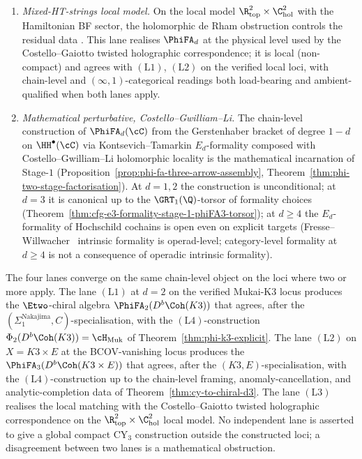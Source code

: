 \begin{definition}
\begin{enumerate}[label=\textup{(L\arabic*)},leftmargin=2em,itemsep=2pt]
\item[(L3)] \emph{Mixed-HT-strings local model.} On the local model
$\R^2_{\mathrm{top}} \times \C^2_{\mathrm{hol}}$ with the
Hamiltonian BF sector, the holomorphic de Rham obstruction
controls the residual data \cite{LorgatMixedHTStrings}. This lane
realises $\PhiFA_d$ at the physical level used by the
Costello--Gaiotto twisted holographic correspondence; it is local
(non-compact) and agrees with $(\mathrm{L1})$, $(\mathrm{L2})$ on
the verified local loci, with chain-level and
$(\infty, 1)$-categorical readings both load-bearing and
ambient-qualified when both lanes apply.

\item[(L4)] \emph{Mathematical perturbative,
Costello--Gwilliam--Li.} The chain-level construction of
$\PhiFA_d(\cC)$ from the Gerstenhaber bracket of degree $1 - d$ on
$\HH^\bullet(\cC)$ via Kontsevich--Tamarkin $E_d$-formality
\cite{Kontsevich1999, Tamarkin2007} composed with
Costello--Gwilliam--Li holomorphic locality
\cite{CostelloGwilliam2017, CostelloLi2016, CostelloLi2020} is the
mathematical incarnation of Stage-$1$
(Proposition~\ref{prop:phi-fa-three-arrow-assembly},
Theorem~\ref{thm:phi-two-stage-factorisation}). At $d = 1, 2$ the
construction is unconditional; at $d = 3$ it is canonical up to the
$\GRT_1(\Q)$-torsor of formality choices
(Theorem~\ref{thm:cfg-e3-formality-stage-1-phiFA3-torsor}); at
$d \ge 4$ the $E_d$-formality of Hochschild cochains is open even on
explicit targets (Fresse--Willwacher~\cite{Willwacher2015} intrinsic
formality is operad-level; category-level formality at $d \ge 4$ is
not a consequence of operadic intrinsic formality).
\end{enumerate}
\end{definition}

\begin{remark}
\label{rem:four-lane-agreement}
The four lanes converge on the same chain-level object on the loci
where two or more apply. The lane $(\mathrm{L1})$ at $d = 2$ on the
verified Mukai-K3 locus produces the $\Etwo$-chiral algebra
$\PhiFA_2(D^b\Coh(K3))$ that agrees, after the
$(\Sigma_1^{\mathrm{Nakajima}}, C)$-specialisation, with the
$(\mathrm{L4})$-construction $\Phi_2(D^b\Coh(K3)) = \cH_{\mathrm{Muk}}$
of Theorem~\ref{thm:phi-k3-explicit}. The lane $(\mathrm{L2})$ on
$X = K3 \times E$ at the BCOV-vanishing locus produces the
$\PhiFA_3(D^b\Coh(K3 \times E))$ that agrees, after the
$(K3, E)$-specialisation, with the $(\mathrm{L4})$-construction up to
the chain-level framing, anomaly-cancellation, and analytic-completion
data of Theorem~\ref{thm:cy-to-chiral-d3}. The lane
$(\mathrm{L3})$ realises the local matching with the Costello--Gaiotto
twisted holographic correspondence on the
$\R^2_{\mathrm{top}} \times \C^2_{\mathrm{hol}}$ local model. No
independent lane is asserted to give a global compact CY$_3$
construction outside the constructed loci; a disagreement between two
lanes is a mathematical obstruction.
\end{remark}

